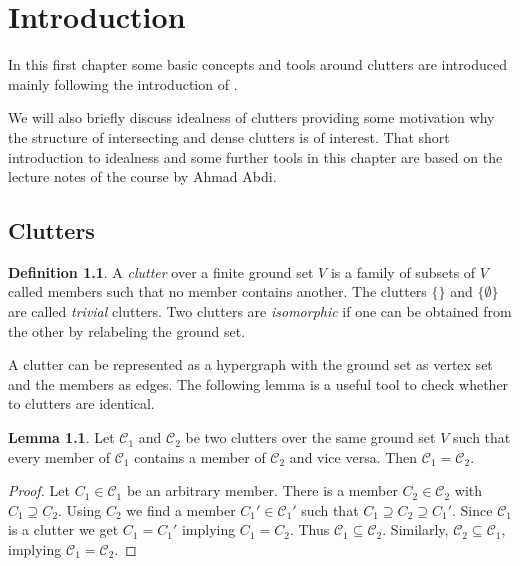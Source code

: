 \documentclass[a4paper, 12pt]{scrbook}
\theoremstyle{definition}
\newtheorem*{definition}{Definition}
\newtheorem{lemma}[theorem]{Lemma}
\begin{document}
   \tableofcontents
   \chapter{Introduction}
   In this first chapter some basic concepts and tools around clutters are introduced mainly following the introduction of \cite{restrictions}.

   We will also briefly discuss idealness of clutters providing some motivation why the structure of intersecting and dense clutters is of interest. That short introduction to idealness and some further tools in this chapter are based on the lecture notes of the course  by Ahmad Abdi\cite{course}.
   \section{Clutters}
   \begin{definition}
       A \emph{clutter} over a finite ground set $V$ is a family of subsets of $V$ called members such that no member contains another\cite{blocker}.
       The clutters $\{\}$ and $\{\emptyset\}$ are called \emph{trivial} clutters.
       Two clutters are \emph{isomorphic} if one can be obtained from the other by relabeling the ground set.
   \end{definition}
   A clutter can be represented as a hypergraph with the ground set as vertex set and the members as edges.
   The following lemma is a useful tool to check whether to clutters are identical.
   \begin{lemma}\label{equalclutters}
       Let $\mathcal{C}_1$ and $\mathcal{C}_2$ be two clutters over the same ground set $V$ such that every member of $\mathcal{C}_1$ contains a member of $\mathcal{C}_2$ and vice versa.
       Then $\mathcal{C}_1=\mathcal{C}_2$.
   \end{lemma}

   \begin{proof}
       Let $C_1 \in \mathcal{C}_1$ be an arbitrary member.
       There is a member $C_2 \in \mathcal{C}_2$ with $C_1 \supseteq C_2$.
       Using $C_2$ we find a member $C_1' \in \mathcal{C}_1'$ such that $C_1 \supseteq C_2 \supseteq C_1'$.
       Since $\mathcal{C}_1$ is a clutter we get $C_1=C_1'$ implying $C_1=C_2$.
       Thus $\mathcal{C}_1 \subseteq \mathcal{C}_2$.
       Similarly, $\mathcal{C}_2 \subseteq \mathcal{C}_1$, implying $\mathcal{C}_1=\mathcal{C}_2$.
   \end{proof}
\end{document}
